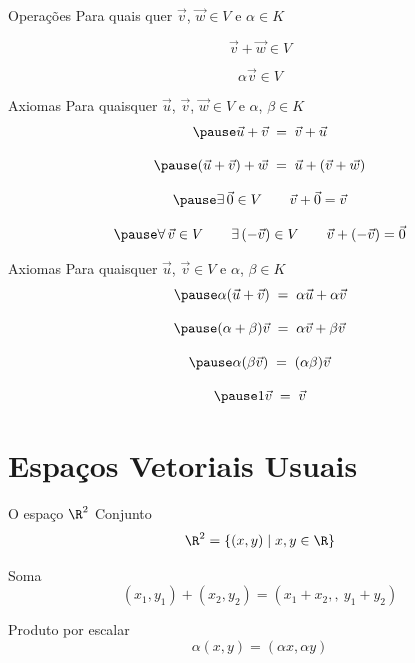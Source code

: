 \documentclass[fleqn,aspectratio=169,12pt]{beamer}
\begin{document}
\begin{frame}{Operações}
  Para quais quer \(\vec{v}\), \(\vec{w}\in V\) e \(\alpha\in K\)

  \pause
  \[
    \vec{v}+\vec{w} \in V
  \]

  \pause
  \[
    \alpha\vec{v} \in V
  \]
\end{frame}

\begin{frame}{Axiomas}
  Para quaisquer \(\vec{u}\), \(\vec{v}\), \(\vec{w}\in V\)
  \pause
  e \(\alpha\), \(\beta\in K\)
  \[
    \pause
    \vec{u}+\vec{v} \;=\; \vec{v}+\vec{u}
  \]

  \[
    \pause
    (\vec{u}+\vec{v})+\vec{w} \;=\; \vec{u}+(\vec{v}+\vec{w})
  \]

  \[
    \pause
    \exists\,\vec{0}\in V
    \qquad
    \vec{v}+\vec{0} = \vec{v}
  \]

  \[
    \pause
    \forall\,\vec{v}\in V
    \qquad
    \exists\,(-\vec{v})\in V
    \qquad
    \vec{v}+(-\vec{v}) = \vec{0}
  \]
\end{frame}

\begin{frame}{Axiomas}
  Para quaisquer \(\vec{u}\), \(\vec{v}\in V\)
  \pause
  e \(\alpha\), \(\beta\in K\)
  \[
    \pause
    \alpha(\vec{u}+\vec{v}) \;=\; \alpha\vec{u}+\alpha\vec{v}
  \]

  \[
    \pause
    (\alpha+\beta)\vec{v} \;=\; \alpha\vec{v}+\beta\vec{v}
  \]

  \[
    \pause
    \alpha(\beta\vec{v}) \;=\; (\alpha\beta)\vec{v}
  \]

  \[
    \pause
    1\vec{v} \;=\; \vec{v}
  \]
\end{frame}

\section{Espaços Vetoriais Usuais}

\begin{frame}{O espaço $\R^2$}
  Conjunto
  \[
    \R^2 = \left\{ (x, y) \mid x, y \in\R \right\}
  \]

  \pause
  Soma
  \[
    (x_1, y_1) + (x_2, y_2) = (x_1+x_2,,\ y_1+y_2)
  \]

  \pause
  Produto por escalar
  \[
    \alpha(x, y) = (\alpha x, \alpha y)
  \]
\end{frame}
\end{document}
